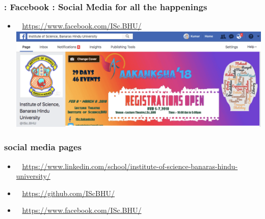 \documentclass{beamer}
\begin{document}
\begin{frame}
 \frametitle{\faFacebookSquare : Facebook : Social Media for all the happenings}
 \begin{itemize}
	\item<+-> \faFacebookSquare~ \url{https://www.facebook.com/ISc.BHU/} \\
	\visible<+->
		{%
		\includegraphics[height=5cm]{Resources/fb.png} \\ %
		}
	\end{itemize}
\end{frame}


\begin{frame}
\frametitle{social media pages}
\begin{itemize}
\item<2-> \faLinkedinSquare~ \url{https://www.linkedin.com/school/institute-of-science-banaras-hindu-university/} \\


\item<3-> \faGithubSquare~ \url{https://github.com/IScBHU/} \\

\item<4-> \faFacebookSquare~ \url{https://www.facebook.com/ISc.BHU/} \\
\end{itemize}
\end{frame}
\end{document}
